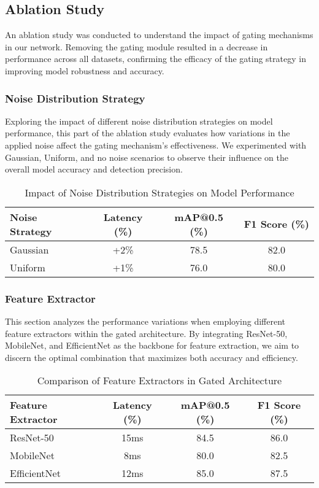 \subsection{Ablation Study}

An ablation study was conducted to understand the impact of gating mechanisms in our network. Removing the gating module resulted in a decrease in performance across all datasets, confirming the efficacy of the gating strategy in improving model robustness and accuracy.

\subsubsection{Noise Distribution Strategy}

Exploring the impact of different noise distribution strategies on model performance, this part of the ablation study evaluates how variations in the applied noise affect the gating mechanism's effectiveness. We experimented with Gaussian, Uniform, and no noise scenarios to observe their influence on the overall model accuracy and detection precision.

\begin{table}[ht]
    \centering
    \caption{Impact of Noise Distribution Strategies on Model Performance}
    \label{tab:noise_distribution}
    \begin{tabular}{@{}lccc@{}}
    \toprule
    Noise Strategy & Latency (\%) & mAP@0.5 (\%) & F1 Score (\%) \\ 
    \midrule
    Gaussian & +2\% & 78.5 & 82.0 \\
    Uniform & +1\% & 76.0 & 80.0 \\
    \bottomrule
    \end{tabular}
\end{table}
    

\subsubsection{Feature Extractor}

This section analyzes the performance variations when employing different feature extractors within the gated architecture. By integrating ResNet-50, MobileNet, and EfficientNet as the backbone for feature extraction, we aim to discern the optimal combination that maximizes both accuracy and efficiency.

\begin{table}[ht]
    \centering
    \caption{Comparison of Feature Extractors in Gated Architecture}
    \label{tab:feature_extractor}
    \begin{tabular}{@{}lccc@{}}
    \toprule
    Feature Extractor & Latency (\%) & mAP@0.5 (\%) & F1 Score (\%) \\ 
    \midrule
    ResNet-50 & 15ms & 84.5 & 86.0 \\
    MobileNet & 8ms & 80.0 & 82.5 \\
    EfficientNet & 12ms & 85.0 & 87.5 \\
    \bottomrule
    \end{tabular}
\end{table}    


